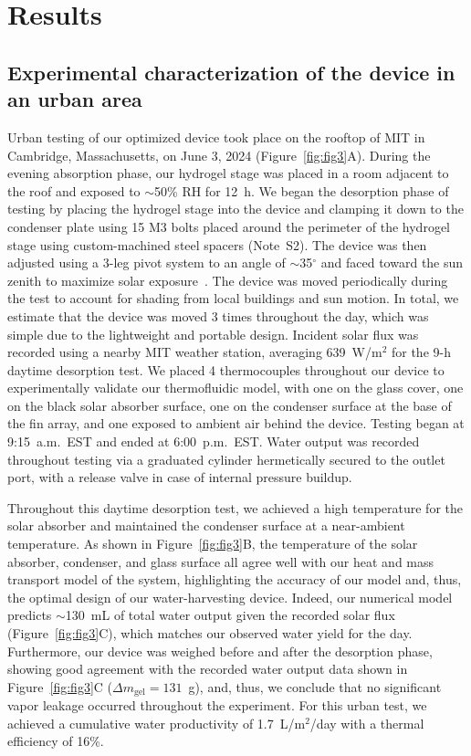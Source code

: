 \documentclass[11pt]{article}
\begin{document}
\section{Results}

\subsection{Experimental characterization of the device in an urban area}

Urban testing of our optimized device took place on the rooftop of MIT in Cambridge, Massachusetts, on June 3, 2024 (Figure~\ref{fig:fig3}A). During the evening absorption phase, our hydrogel stage was placed in a room adjacent to the roof and exposed to $\sim$50\% RH for 12~h. We began the desorption phase of testing by placing the hydrogel stage into the device and clamping it down to the condenser plate using 15 M3 bolts placed around the perimeter of the hydrogel stage using custom-machined steel spacers (Note~S2). The device was then adjusted using a 3-leg pivot system to an angle of $\sim$35$^\circ$ and faced toward the sun zenith to maximize solar exposure~\cite{tutiempo2024}. The device was moved periodically during the test to account for shading from local buildings and sun motion. In total, we estimate that the device was moved 3 times throughout the day, which was simple due to the lightweight and portable design. Incident solar flux was recorded using a nearby MIT weather station, averaging 639~W/m$^2$ for the 9-h daytime desorption test. We placed 4 thermocouples throughout our device to experimentally validate our thermofluidic model, with one on the glass cover, one on the black solar absorber surface, one on the condenser surface at the base of the fin array, and one exposed to ambient air behind the device. Testing began at 9:15~a.m.\ EST and ended at 6:00~p.m.\ EST. Water output was recorded throughout testing via a graduated cylinder hermetically secured to the outlet port, with a release valve in case of internal pressure buildup.

Throughout this daytime desorption test, we achieved a high temperature for the solar absorber and maintained the condenser surface at a near-ambient temperature. As shown in Figure~\ref{fig:fig3}B, the temperature of the solar absorber, condenser, and glass surface all agree well with our heat and mass transport model of the system, highlighting the accuracy of our model and, thus, the optimal design of our water-harvesting device. Indeed, our numerical model predicts $\sim$130~mL of total water output given the recorded solar flux (Figure~\ref{fig:fig3}C), which matches our observed water yield for the day. Furthermore, our device was weighed before and after the desorption phase, showing good agreement with the recorded water output data shown in Figure~\ref{fig:fig3}C ($\Delta m_{\mathrm{gel}} = 131$~g), and, thus, we conclude that no significant vapor leakage occurred throughout the experiment. For this urban test, we achieved a cumulative water productivity of 1.7~L/m$^2$/day with a thermal efficiency of 16\%.
\end{document}
